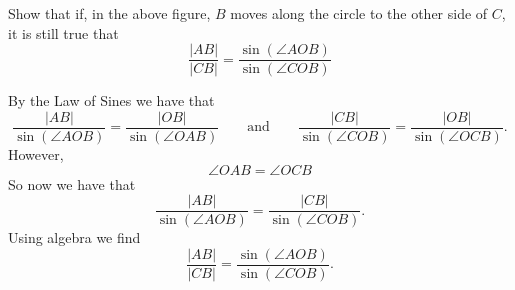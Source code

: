 \documentclass{ximera}
\begin{document}
\begin{problem}
\label{47} Show that if, in the above figure, $B$ moves along the
circle to the other side of $C$, it is still true that%
\[
\frac{\left\vert AB\right\vert }{\left\vert CB\right\vert }=\frac
{\sin\left(  \angle AOB\right)  }{\sin\left(  \angle
COB\right)  }%
\]
\begin{freeResponse}
By the Law of Sines we have that
\[
\frac{|AB|}{\sin(\angle AOB)} = \frac{|OB|}{\sin(\angle OAB)}\qquad\text{and}\qquad\frac{|CB|}{\sin(\angle COB)} = \frac{|OB|}{\sin(\angle OCB)}.
\]
However, 
\[
\angle OAB = \angle OCB
\]
So now we have that
\[
\frac{|AB|}{\sin(\angle AOB)} =\frac{|CB|}{\sin(\angle COB)}. 
\]
Using algebra we find 
\[
\frac{\left\vert AB\right\vert }{\left\vert CB\right\vert }=\frac
{\sin\left(  \angle AOB\right)  }{\sin\left(  \angle
COB\right)  }.
\]
\end{freeResponse}
\end{problem}
\end{document}
